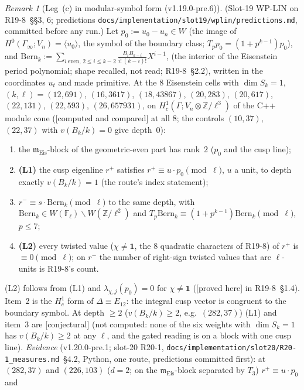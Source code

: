 \documentclass[11pt]{article}
\theoremstyle{remark}
\newtheorem{remark}[theorem]{Remark}
\newcommand{\F}{\mathbb{F}}
\newcommand{\Z}{\mathbb{Z}}
\newcommand{\Ga}{\Gamma}
\newcommand{\m}{\mathfrak{m}}
\newcommand{\PROVED}{\textsf{[proved here]}}
\newcommand{\CONJ}{\textsf{[conjectural]}}
\newcommand{\CMPD}{\textsf{[computed and compared]}}   %
\begin{document}
\begin{remark}[Leg~(c) in modular-symbol form (v1.19.0-pre.6)]\label{rmk:lvlegc}
(Slot-19 WP-LIN on R19-8~\S\S3, 6; predictions \texttt{docs/implementation/slot19/wplin/predictions.md}, committed before any run.) Let $p_0:=u_0-u_n\in W$ (the image of
$H^{0}(\Ga_\infty;V_n)=\langle u_0\rangle$, the symbol of the boundary class; $T_pp_0=(1+p^{k-1})p_0$), and
$\mathrm{Bern}_k:=\sum_{i\ \mathrm{even},\,2\le i\le k-2}\frac{B_iB_{k-i}}{i!\,(k-i)!}X^{i-1}$, (the interior of the Eisenstein period polynomial; shape recalled, not read; R19-8~\S2.2), written in the coordinates $u_t$ and made primitive. At the $8$ Eisenstein cells with
$\dim S_k=1$, $(k,\ell)=(12,691)$, $(16,3617)$, $(18,43867)$, $(20,283)$, $(20,617)$, $(22,131)$, $(22,593)$, $(26,657931)$, on $H^{1}_c(\Ga;V_n\otimes\Z/\ell^{3})$ of the C++ module cone
(\CMPD{} at all $8$; the controls $(10,37)$, $(22,37)$ with $v(B_k/k)=0$ give depth~$0$):
\begin{enumerate}
\item the $\m_{\mathrm{Eis}}$-block of the geometric-even part has rank~$2$ ($p_0$ and the cusp line);
\item \textbf{(L1)} the cusp eigenline $r^{+}$ satisfies $r^{+}\equiv u\cdot p_0\pmod\ell$, $u$ a unit, to depth exactly $v(B_k/k)=1$ (the route's index statement);
\item $r^{-}\equiv s\cdot\mathrm{Bern}_k\pmod\ell$ to the same depth, with $\mathrm{Bern}_k\in W(\F_\ell)\smallsetminus W(\Z/\ell^{2})$ and $T_p\mathrm{Bern}_k\equiv(1+p^{k-1})\mathrm{Bern}_k\pmod\ell$, $p\le7$;
\item \textbf{(L2)} every twisted value ($\chi\neq\mathbf1$, the $8$ quadratic characters of R19-8) of $r^{+}$ is $\equiv0\pmod\ell$; on $r^{-}$ the number of right-sign twisted values
  that are $\ell$-units is R19-8's count.
\end{enumerate}
(L2) follows from (L1) and $\lambda_{\chi,j}(p_0)=0$ for $\chi\neq\mathbf1$ (\PROVED{} in R19-8~\S1.4). Item~2 is the $H^{1}_c$ form of $\Delta\equiv E_{12}$: the integral cusp vector is congruent
to the boundary symbol. At depth $\ge2$ ($v(B_k/k)\ge2$, e.g.\ $(282,37)$) (L1) and item~3 are \CONJ{} (not computed: none of the six weights with $\dim S_k=1$ has
$v(B_k/k)\ge2$ at any $\ell$, and the gated reading is on a block with one cusp line). \emph{Evidence} (v1.20.0-pre.1; slot-20 R20-1, \texttt{docs/implementation/slot20/R20-1\_measures.md}~\S4.2,
Python, one route, predictions committed first): at $(282,37)$ and $(226,103)$ ($d=2$; on the $\m_{\mathrm{Eis}}$-block separated by $T_3$) $r^{+}\equiv u\cdot p_0$ and

\end{remark}
\end{document}
